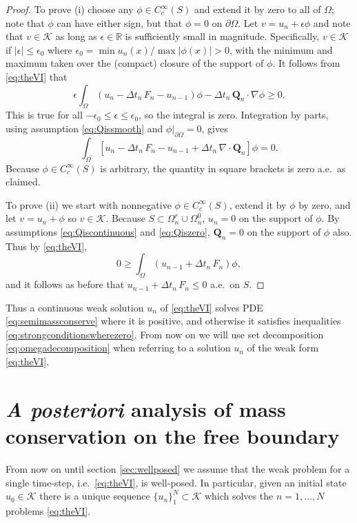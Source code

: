 \documentclass[final,leqno,onefignum,onetabnum]{siamltex1213bueler}
\newcommand\bQ{\mathbf{Q}}
\newcommand{\Div}{\nabla\cdot}
\newcommand\eps{\epsilon}
\renewcommand{\grad}{\nabla}
\newcommand\RR{\mathbb{R}}
\begin{document}
\medskip
\begin{proof}  To prove (i) choose any $\phi\in C_c^\infty(S)$ and extend it by zero to all of $\Omega$; note that $\phi$ can have either sign, but that $\phi=0$ on $\partial\Omega$.  Let $v = u_n + \eps \phi$ and note that $v \in \mathcal{K}$ as long as $\eps\in\RR$ is sufficiently small in magnitude.  Specifically, $v \in \mathcal{K}$ if $|\eps|\le \eps_0$ where $\eps_0 = \min u_n(x) / \max |\phi(x)| > 0$, with the minimum and maximum taken over the (compact) closure of the support of $\phi$.  It follows from \eqref{eq:theVI} that
   $$\eps \int_\Omega \left(u_n - \Delta t_n\,F_n - u_{n-1}\right)\phi - \Delta t_n\,\bQ_n \cdot \grad \phi \ge 0.$$
This is true for all $-\eps_0 \le \eps \le \eps_0$, so the integral is zero.  Integration by parts, using assumption \eqref{eq:Qissmooth} and $\phi\big|_{\partial\Omega}=0$, gives
   $$\int_\Omega \left[ u_n - \Delta t_n\,F_n - u_{n-1} + \Delta t_n\,\Div\bQ_n \right]\phi = 0.$$
Because $\phi\in C_c^\infty(S)$ is arbitrary, the quantity in square brackets is zero a.e.~as claimed.

To prove (ii) we start with nonnegative $\phi\in C_c^\infty(S)$, extend it by $\phi$ by zero, and let $v = u_n + \phi$ so $v\in\mathcal{K}$.  Because $S\subset \Omega_n^r\cup\Omega_n^0$, $u_n=0$ on the support of $\phi$.  By assumptions \eqref{eq:Qiscontinuous} and \eqref{eq:Qiszero}, $\bQ_n=0$ on the support of $\phi$ also.  Thus by \eqref{eq:theVI},
    $$0 \ge \int_{\Omega} \left(u_{n-1} + \Delta t_n\, F_n\right) \phi,$$
and it follows as before that $u_{n-1} + \Delta t_n\, F_n \le 0$ a.e.~on $S$.\end{proof}

\medskip
Thus a continuous weak solution $u_n$ of \eqref{eq:theVI} solves PDE \eqref{eq:semimassconserve} where it is positive, and otherwise it satisfies inequalities \eqref{eq:strongconditionswherezero}.  From now on we will use set decomposition \eqref{eq:omegadecomposition} when referring to a solution $u_n$ of the weak form \eqref{eq:theVI}.


\section{\emph{A posteriori} analysis of mass conservation on the free boundary}  \label{sec:timeseries}

From now on until section \ref{sec:wellposed} we assume that the weak problem for a single time-step, i.e.~\eqref{eq:theVI}, is well-posed.  In particular, given an initial state $u_0\in\mathcal{K}$ there is a unique sequence $\{u_n\}_1^N \subset \mathcal{K}$ which solves the $n=1,\dots,N$ problems \eqref{eq:theVI}.
\end{document}
